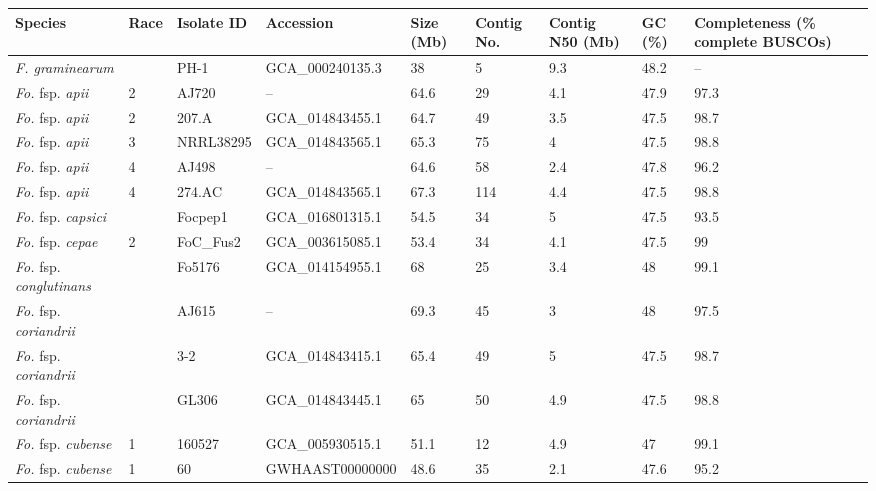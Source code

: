 \begin{ThreePartTable}
\begin{longtable}[c]{@{}C{2.5cm}C{0.8cm}C{2cm}C{2.8cm}C{1cm}C{1cm}C{1.5cm}C{0.7cm}C{2.5cm}@{}}
\label{tab:GenomeDB}\\
\toprule
\textbf{Species} &
  \textbf{Race} &
  \textbf{Isolate ID} &
  \textbf{Accession} &
  \textbf{Size (Mb)} &
  \textbf{Contig No.} &
  \textbf{Contig N50 (Mb)} &
  \textbf{GC (\%)} &
  \textbf{Completeness (\% complete BUSCOs)} \\* \midrule
\endhead
%
\bottomrule
\endfoot
%
\endlastfoot
%
\textit{F. graminearum}        &     & PH-1         & GCA\_000240135.3 & 38   & 5     & 9.3  & 48.2 &--    \\
\textit{Fo.} fsp. \textit{apii}         & 2   & AJ720        &--             & 64.6 & 29    & 4.1  & 47.9 & 97.3 \\
\textit{Fo.} fsp. \textit{apii}         & 2   & 207.A        & GCA\_014843455.1 & 64.7 & 49    & 3.5  & 47.5 & 98.7 \\
\textit{Fo.} fsp. \textit{apii}         & 3   & NRRL38295    & GCA\_014843565.1 & 65.3 & 75    & 4    & 47.5 & 98.8 \\
\textit{Fo.} fsp. \textit{apii}         & 4   & AJ498        & --             & 64.6 & 58    & 2.4  & 47.8 & 96.2 \\
\textit{Fo.} fsp. \textit{apii}         & 4   & 274.AC       & GCA\_014843565.1 & 67.3 & 114   & 4.4  & 47.5 & 98.8 \\
\textit{Fo.} fsp. \textit{capsici}      &     & Focpep1      & GCA\_016801315.1 & 54.5 & 34    & 5    & 47.5 & 93.5    \\
\textit{Fo.} fsp. \textit{cepae}        & 2   & FoC\_Fus2    & GCA\_003615085.1 & 53.4 & 34    & 4.1  & 47.5 & 99   \\
\textit{Fo.} fsp. \textit{conglutinans} &     & Fo5176       & GCA\_014154955.1 & 68   & 25    & 3.4  & 48   & 99.1 \\
\textit{Fo.} fsp. \textit{coriandrii}   &     & AJ615        &--             & 69.3 & 45    & 3    & 48   & 97.5 \\
\textit{Fo.} fsp. \textit{coriandrii}   &     & 3-2          & GCA\_014843415.1 & 65.4 & 49    & 5    & 47.5 & 98.7 \\
\textit{Fo.} fsp. \textit{coriandrii}   &     & GL306        & GCA\_014843445.1 & 65   & 50    & 4.9  & 47.5 & 98.8 \\
\textit{Fo.} fsp. \textit{cubense}      & 1   & 160527       & GCA\_005930515.1 & 51.1 & 12    & 4.9  & 47   & 99.1 \\
\textit{Fo.} fsp. \textit{cubense}      & 1   & 60           & GWHAAST00000000  & 48.6 & 35    & 2.1  & 47.6 & 95.2 \\

\end{longtable}
\end{ThreePartTable}

